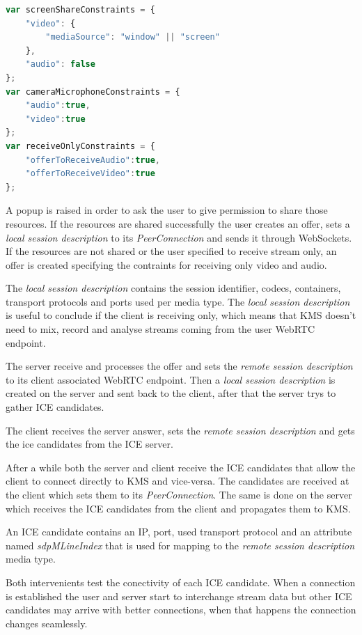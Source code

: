 \begin{lstlisting}[caption={Media constraints},language=JavaScript]
var screenShareConstraints = {	
	"video": {
		"mediaSource": "window" || "screen"
	}, 
	"audio": false
};
var cameraMicrophoneConstraints = {
	"audio":true, 
	"video":true 
};
var receiveOnlyConstraints = {
	"offerToReceiveAudio":true,
	"offerToReceiveVideo":true
};
\end{lstlisting}

A popup is raised in order to ask the user to give permission to share those resources. If the resources are shared successfully the user creates an offer, sets a \emph{local session description} to its \emph{PeerConnection} and sends it through WebSockets. If the resources are not shared or the user specified to receive stream only, an offer is created specifying the contraints for receiving only video and audio.

The \emph{local session description} contains the session identifier, codecs, containers, transport protocols and ports used per media type. The \emph{local session description} is useful to conclude if the client is receiving only, which means that \ac{KMS} doesn't need to mix, record and analyse streams coming from the user \ac{WebRTC} endpoint. 

The server receive and processes the offer and sets the \emph{remote session description} to its client associated \ac{WebRTC} endpoint. Then a \emph{local session description} is created on the server and sent back to the client, after that the server trys to gather \ac{ICE} candidates.

The client receives the server answer, sets the \emph{remote session description} and gets the ice candidates from the \ac{ICE} server. 

After a while both the server and client receive the \ac{ICE} candidates that allow the client to connect directly to \ac{KMS} and vice-versa. The candidates are received at the client which sets them to its \emph{PeerConnection}. The same is done on the server which receives the \ac{ICE} candidates from the client and propagates them to \ac{KMS}.

An \ac{ICE} candidate contains an \ac{IP}, port, used transport protocol and an attribute named \emph{sdpMLineIndex} that is used for mapping to the \emph{remote session description} media type.

Both intervenients test the conectivity of each \ac{ICE} candidate. When a connection is established the user and server start to interchange stream data but other \ac{ICE} candidates may arrive with better connections, when that happens the connection changes seamlessly. 

